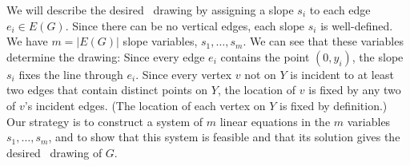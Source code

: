 
We will describe the desired \Fary\ drawing by assigning a slope $s_i$
to each edge $e_i\in E(G)$.   Since there can be no vertical edges,
each slope $s_i$ is well-defined. We have $m=|E(G)|$ slope variables,
$s_1,\ldots,s_m$. 
We can see that these variables determine the drawing:
 Since every edge $e_i$ contains the point $(0,y_i)$,
the slope $s_i$ fixes the line through $e_i$.  Since every vertex $v$
not on $Y$ is incident to at least two edges that contain distinct points
on $Y$, the location of $v$ is fixed by any two of $v$'s incident edges.  
(The location of each vertex on
$Y$ is fixed by definition.)  Our strategy is to construct a
system of $m$ linear equations in the $m$ variables $s_1,\ldots,s_m$,
and to show that
this system is feasible and that its solution gives the desired \Fary\
drawing of $G$.

